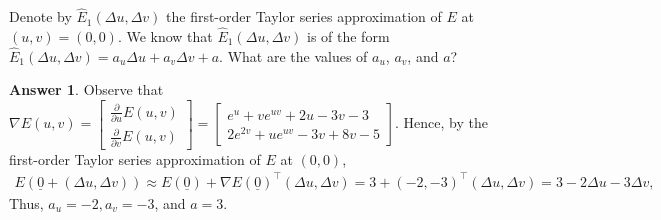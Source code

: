 \documentclass{article}
\theoremstyle{definition}
\newtheorem*{answer}{Answer}
\begin{document}
\begin{question}[start=0]
\begin{question}
		\begin{question}
			\item Denote by $\hat{E}_1(\Delta u, \Delta v)$ the first-order Taylor series approximation of $E$ at $(u, v) = (0, 0)$. We know that $\hat{E}_1(\Delta u, \Delta v)$ is of the form $\hat{E}_1(\Delta u, \Delta v) = a_u \Delta u + a_v \Delta v + a$. What are the values of $a_u$, $a_v$, and $a$?
			\begin{answer}
				Observe that $\nabla E (u,v) = \begin{bmatrix}
					{\frac {\partial }{\partial u}} E (u,v) \\
					{\frac {\partial }{\partial v}} E (u,v)
				\end{bmatrix} = \begin{bmatrix}
				e^u+ve^{uv}+2u-3v-3 \\
				2e^{2v} + u e^{uv} - 3v +8v-5
				\end{bmatrix}$. Hence, by the first-order Taylor series approximation of $E$ at $(0,0)$,
				\begin{align*}
					E\left(\underline{0} + (\Delta u, \Delta v)\right) \approx E(\underline{0}) + \nabla E(\underline{0})^\top (\Delta u, \Delta v) = 3 + (-2, -3)^\top (\Delta u, \Delta v) = 3 -2\Delta u - 3\Delta v,
				\end{align*}
				Thus, $a_u = -2, a_v = -3$, and $a=3$.
			\end{answer}
			

\end{question}
\end{question}
\end{question}
\end{document}
